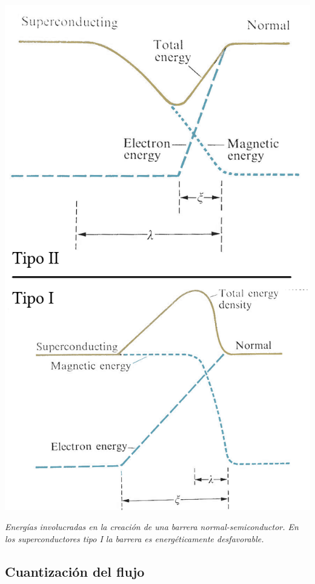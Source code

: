 \documentclass{tufte-book}
\begin{document}
\begin{marginfigure}
  \centering
  \includegraphics[width=\textwidth]{figures/tipos.png}
  \caption{\itshape Energías involucradas en la creación de una barrera
    normal-semiconductor. En los superconductores tipo I la barrera es
    energéticamente desfavorable.}
  \label{fig:balance}
\end{marginfigure}

\subsection{Cuantización del flujo}
\end{document}
